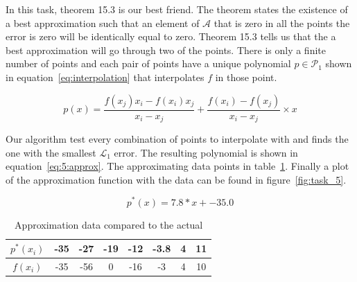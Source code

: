 \begin{solution}
  In this task, theorem 15.3 is our best friend. The theorem states
  the existence of a best approximation such that an element of
  $\mathcal{A}$ that is zero in all the points the error is zero will
  be identically equal to zero. Theorem 15.3 tells us that the a best
  approximation will go through two of the points. There is only a
  finite number of points and each pair of points have a unique
  polynomial $p \in \mathcal{P}_1$ shown in
  equation~\ref{eq:interpolation} that interpolates $f$ in those
  point.
  
  \begin{equation}
    \label{eq:interpolation}
    p(x) = \frac{f(x_j)x_i - f(x_i) x_j}{x_i - x_j} + 
    \frac{f(x_i) - f(x_j)}{x_i - x_j} \times x
  \end{equation}

  Our algorithm test every combination of points to interpolate with
  and finds the one with the smallest $\mathcal{L}_1$ error. The
  resulting polynomial is shown in equation~\ref{eq:5:approx}. The
  approximating data points in table~\ref{tab:approx}. Finally a plot
  of the approximation function with the data can be found in
  figure~\ref{fig:task_5}.
  
  \begin{equation}
    \label{eq:5:approx}
    p^*(x) =  7.8*x + -35.0
  \end{equation}
  
  \begin{table}[!ht]
    \caption{Approximation data compared to the actual}
    \label{tab:approx}
    \begin{center}
      \begin{tabular}{| c | c  c c c c c c | }
        \hline			
         $p^*(x_i)$ & -35 & -27 & -19 & -12 &-3.8 & 4 & 11 \\
        \hline
        $f(x_i)$ & -35 & -56 & 0 & -16 & -3 & 4 & 10 \\
        \hline  
      \end{tabular}
    \end{center}
  \end{table}



\end{solution}
